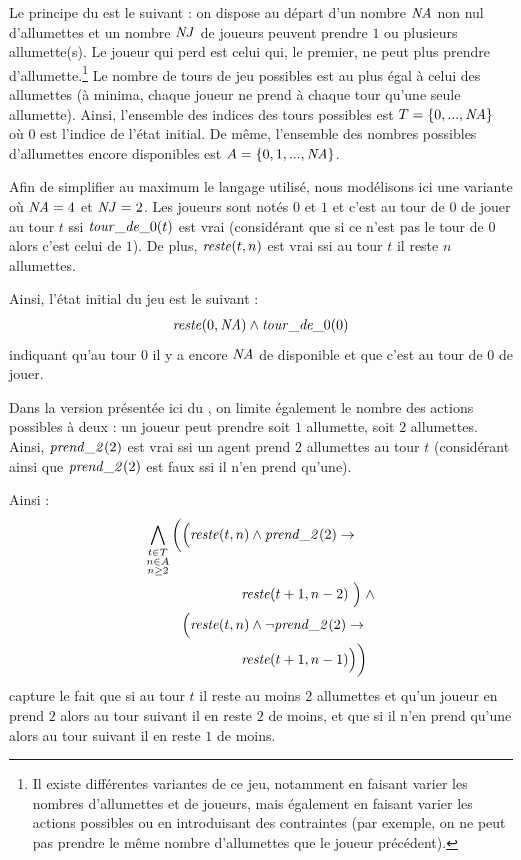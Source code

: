 Le principe du \game est le suivant : on dispose au départ d'un nombre $\nbAllumettes$ non nul d'allumettes
et un nombre $\nbJoueurs$ de joueurs peuvent prendre $1$ ou plusieurs allumette(s). Le joueur qui perd est celui qui, le premier, ne peut plus prendre d'allumette.\footnote{Il existe différentes variantes de ce jeu, notamment en faisant varier les nombres d'allumettes et de joueurs, mais également en faisant varier les actions possibles ou en introduisant des contraintes (par exemple, on ne peut pas prendre le même nombre d'allumettes que le joueur précédent).} Le nombre de tours de jeu possibles est au plus égal à celui des allumettes (à minima, chaque joueur ne prend à chaque tour qu'une seule allumette). Ainsi, l'ensemble des indices des tours possibles est $\turnsSet = \{ 0, ..., \nbAllumettes \}$ où $0$ est l'indice de l'état initial. De même, l'ensemble des nombres possibles d'allumettes encore disponibles est $\matchesSet = \{ 0, 1, ..., \nbAllumettes \}$.

Afin de simplifier au maximum le langage utilisé, nous modélisons ici une variante où $\nbAllumettes = 4$ et $\nbJoueurs = 2$. Les joueurs sont notés $0$ et $1$ et c'est au tour de $0$ de jouer au tour $t$ ssi $\turn{t}$ est vrai (considérant que si ce n'est pas le tour de $0$ alors c'est celui de $1$). De plus, $\rest{t}{n}$ est vrai ssi au tour $t$ il reste $n$ allumettes.

Ainsi, l'état initial du jeu est le suivant : 
\begin{gather}
\rest{0}{\nbAllumettes} \land \turn{0}
\label{eq:initialState}
\end{gather}
indiquant qu'au tour $0$ il y a encore $\nbAllumettes$ de disponible et que c'est au tour de $0$ de jouer.

Dans la version présentée ici du \game, on limite également le nombre des actions possibles à deux : un joueur peut prendre soit $1$ allumette, soit $2$ allumettes. Ainsi, $\takes{t}$ est vrai ssi un agent prend $2$ allumettes au tour $t$ (considérant ainsi que $\takes{t}$ est faux ssi il n'en prend qu'une). 

Ainsi :
\begin{align}
\begin{split}
\bigwedge_{\substack{t \in \turnsSet\\ n \in \matchesSet\\ n \geq 2}}
    \bigg ( & \Big ( \rest{t}{n} \land \takes{t} \limp\\
    & \hspace{1.5cm}\rest{t+1}{n-2} \ \Big ) \; \land \\
    & \Big ( \rest{t}{n} \land \neg \takes{t} \limp \\
    & \hspace{1.5cm}\rest{t+1}{n-1} \Big ) \bigg )
\end{split}
\end{align}
capture le fait que si au tour $t$ il reste au moins $2$ allumettes et qu'un joueur en prend $2$ alors au tour suivant il en reste $2$ de moins, et que si il n'en prend qu'une alors au tour suivant il en reste $1$ de moins.

